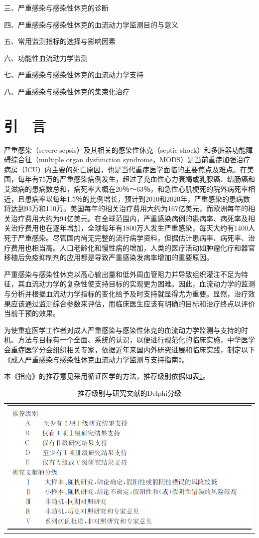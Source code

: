 三、严重感染与感染性休克的诊断

四、严重感染与感染性休克的血流动力学监测目的与意义

五、常用监测指标的选择与影响因素

六、功能性血流动力学监测

七、严重感染与感染性休克的血流动力学支持

八、严重感染与感染性休克的集束化治疗

\section{引　言}

严重感染（severe sepsis）及其相关的感染性休克（septic
shock）和多脏器功能障碍综合征（multiple organ dysfunction
syndrome，MODS）是当前重症加强治疗病房（ICU）内主要的死亡原因，也是当代重症医学面临的主要焦点及难点。在美国，每年有75万的严重感染病例发生，超过了充血性心力衰竭或乳腺癌、结肠癌和艾滋病的患病数总和，病死率大概在20％～63％，和急性心肌梗死的院外病死率相近，且患病率以每年1.5％的比例增长，预计到2010和2020年，严重感染的患病数将达到93万和110万。美国每年的相关治疗费用大约为167亿美元，而欧洲每年的相关治疗费用大约为94亿美元。在全球范围内，严重感染病例的患病率、病死率及相关治疗费用也在逐年增加，全球每年有1800万人发生严重感染，每天大约有1400人死于严重感染。尽管国内尚无完整的流行病学资料，但据估计患病率、病死率、治疗费用也相当高。人口老龄化和慢性病的增加，人类的医疗活动如肿瘤化疗和器官移植后免疫抑制剂的应用都是导致严重感染发病率增加的重要原因。

严重感染与感染性休克以高心输出量和低外周血管阻力并导致组织灌注不足为特征，其血流动力学的复杂性使支持目标的实现更为困难。因此，血流动力学的监测与分析并根据血流动力学指标的变化给予及时支持就显得尤为重要。显然，治疗效果应该通过监测综合参数来评估，而临床医生应该有明确的目标和治疗终点以评价当前干预的效果。

为使重症医学工作者对成人严重感染与感染性休克的血流动力学监测与支持的时机、方法与目标有一个全面、系统的认识，以便进行规范化的临床实施，中华医学会重症医学分会组织相关专家，依据近年来国内外研究进展和临床实践，制定以下《成人严重感染与感染性休克血流动力学监测与支持指南》。

本《指南》的推荐意见采用循证医学的方法，推荐级别依据如表\ref{tabapp-1}。

\begin{longtable}{c}
  \caption{推荐级别与研究文献的Delphi分级}
  \label{tabapp-1}
  \endfirsthead
  \caption[]{推荐级别与研究文献的Delphi分级}
  \endhead
\includegraphics[width=\textwidth,height=\textheight,keepaspectratio]{./images/Image00299.jpg}
\end{longtable}

